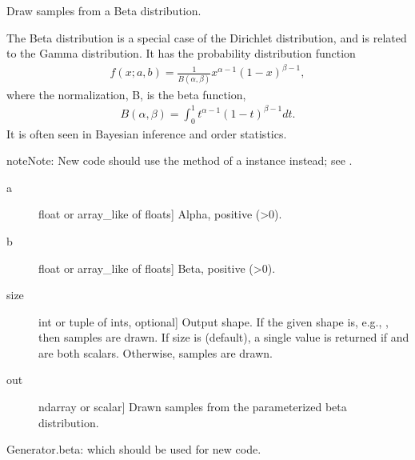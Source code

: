 \documentclass[letterpaper,10pt,english]{sphinxmanual}
\begin{document}
\begin{fulllineitems}
\label{\detokenize{infrapy.utils:infrapy.utils.ref2sac.beta}}
Draw samples from a Beta distribution.

The Beta distribution is a special case of the Dirichlet distribution,
and is related to the Gamma distribution.  It has the probability
distribution function
\begin{equation*}
\begin{split}f(x; a,b) = \frac{1}{B(\alpha, \beta)} x^{\alpha - 1}
(1 - x)^{\beta - 1},\end{split}
\end{equation*}
where the normalization, B, is the beta function,
\begin{equation*}
\begin{split}B(\alpha, \beta) = \int_0^1 t^{\alpha - 1}
(1 - t)^{\beta - 1} dt.\end{split}
\end{equation*}
It is often seen in Bayesian inference and order statistics.

\begin{sphinxadmonition}{note}{Note:}
New code should use the  method of a 
instance instead; see .
\end{sphinxadmonition}
\begin{description}
\item[{a}] \leavevmode{[}float or array\_like of floats{]}
Alpha, positive (\textgreater{}0).

\item[{b}] \leavevmode{[}float or array\_like of floats{]}
Beta, positive (\textgreater{}0).

\item[{size}] \leavevmode{[}int or tuple of ints, optional{]}
Output shape.  If the given shape is, e.g., , then
 samples are drawn.  If size is  (default),
a single value is returned if  and  are both scalars.
Otherwise,  samples are drawn.

\end{description}
\begin{description}
\item[{out}] \leavevmode{[}ndarray or scalar{]}
Drawn samples from the parameterized beta distribution.

\end{description}

Generator.beta: which should be used for new code.

\end{fulllineitems}
\end{document}
